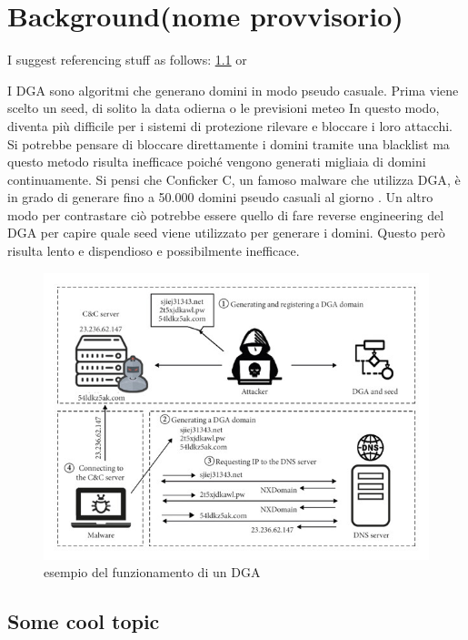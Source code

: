 \documentclass[12pt,a4paper,openright,twoside]{book}
\begin{document}

\chapter{Background(nome provvisorio)}

I suggest referencing stuff as follows: \cref{fig:DGA example} or 

I \acrshort{DGA} sono algoritmi che generano domini in modo pseudo casuale.
Prima viene scelto un seed, di solito la data odierna
o le previsioni meteo \cite{8621875}
In questo modo, diventa più difficile per i sistemi di protezione
rilevare e bloccare i loro attacchi.
Si potrebbe pensare di bloccare direttamente i domini tramite
una blacklist ma questo metodo
risulta inefficace poiché vengono generati migliaia di domini
continuamente. Si pensi che Conficker C, un famoso malware
che utilizza \acrshort{DGA}, è in grado di generare
fino a 50.000 domini pseudo casuali al giorno \cite{978131}.
Un altro modo per contrastare ciò
potrebbe essere quello di fare reverse engineering
del \acrshort{DGA} per capire quale seed viene utilizzato per generare i domini.
Questo però risulta lento e dispendioso e possibilmente inefficace. \cite{8887881}


\begin{figure}
    \centering
    \includegraphics[width=.8\linewidth]{figures/DGA example.jpg}
    \caption{esempio del funzionamento di un \acrshort{DGA}}
    \label{fig:DGA example}
\end{figure}

\section{Some cool topic}
\end{document}
